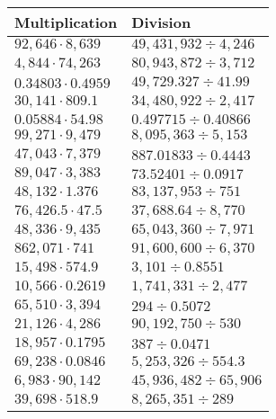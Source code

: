 \begin{longtable}[]{@{}ll@{}}
\toprule
Multiplication & Division\tabularnewline
\midrule
\endhead
\(92,646\cdot 8,639\) & \(49,431,932÷4,246\)\tabularnewline
\(4,844\cdot74,263\) & \(80,943,872÷3,712\)\tabularnewline
\(0.34803\cdot0.4959\) & \(49,729.327 ÷41.99\)\tabularnewline
\(30,141\cdot809.1\) & \(34,480,922÷2,417\)\tabularnewline
\(0.05884\cdot54.98\) & \(0.497715÷0.40866\)\tabularnewline
\(99,271\cdot 9,479\) & \(8,095,363÷5,153\)\tabularnewline
\(47,043\cdot7,379\) & \(887.01833÷0.4443\)\tabularnewline
\(89,047\cdot3,383\) & \(73.52401÷0.0917\)\tabularnewline
\(48,132\cdot1.376\) & \(83,137,953÷751\)\tabularnewline
\(76,426.5 \cdot47.5\) & \(37,688.64÷8,770\)\tabularnewline
\(48,336\cdot9,435\) & \(65,043,360÷7,971\)\tabularnewline
\(862,071\cdot741\) & \(91,600,600÷6,370\)\tabularnewline
\(15,498\cdot574.9\) & \(3,101÷0.8551\)\tabularnewline
\(10,566\cdot 0.2619\) & \(1,741,331÷2,477\)\tabularnewline
\(65,510\cdot3,394\) & \(294÷0.5072\)\tabularnewline
\(21,126\cdot4,286\) & \(90,192,750÷530\)\tabularnewline
\(18,957\cdot0.1795\) & \(387÷0.0471\)\tabularnewline
\(69,238\cdot0.0846\) & \(5,253,326÷554.3\)\tabularnewline
\(6,983\cdot90,142\) & \(45,936,482÷65,906\)\tabularnewline
\(39,698\cdot518.9\) & \(8,265,351÷289\)\tabularnewline
\bottomrule
\end{longtable}
